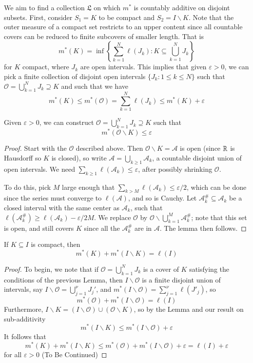 We aim to find a collection $\mathfrak{L}$ on which $m^*$ is countably additive on disjoint subsets. First, consider $S_1 = K$ to be compact and $S_2 = I\backslash K$. Note that the outer measure of a compact set restricts to an upper content since all countable covers can be reduced to finite subcovers of smaller length. That is $$m^*(K) = \inf\left\{\sum_{k=1}^N\ell(J_k):K\subseteq \bigcup_{k=1}^NJ_k\right\}$$ for $K$ compact, where $J_k$ are open intervals. This implies that given $\varepsilon > 0$, we can pick a finite collection of disjoint open intervals $\{J_k:1\leq k \leq N\}$ such that $\mathcal{O} = \bigcup_{k=1}^NJ_k\supseteq K$ and such that we have $$m^*(K) \leq m^*(\mathcal{O}) = \sum_{k=1}^N\ell(J_k)\leq m^*(K)+\varepsilon$$

\begin{lem}
    Given $\varepsilon > 0$, we can construct $\mathcal{O} = \bigcup_{k=1}^NJ_k \supseteq K$ such that $$m^*\left(\mathcal{O}\backslash K\right) \leq \varepsilon$$
\end{lem}
\begin{proof}
    Start with the $\mathcal{O}$ described above. Then $\mathcal{O}\backslash K = \mathcal{A}$ is open (since $\mathbb R$ is Hausdorff so $K$ is closed), so write $\mathcal{A} = \bigcup_{k\geq 1}\mathcal{A}_k$, a countable disjoint union of open intervals. We need $\sum_{k\geq 1}\ell(\mathcal{A}_k) \leq \varepsilon$, after possibly shrinking $\mathcal{O}$.

    To do this, pick $M$ large enough that $\sum_{k > M}\ell(\mathcal{A}_k) \leq \varepsilon/2$, which can be done since the series must converge to $\ell(\mathcal{A})$, and so is Cauchy. Let $\mathcal{A}_k^{\#} \subseteq \mathcal{A}_k$ be a closed interval with the same center as $\mathcal{A}_k$, such that $\ell(\mathcal{A}_k^{\#}) \geq \ell(\mathcal{A}_k) - \varepsilon/2M$. We replace $\mathcal{O}$ by $\mathcal{O}\backslash\bigcup_{k=1}^M\mathcal{A}_k^{\#}$; note that this set is open, and still covers $K$ since all the $\mathcal{A}_k^{\#}$ are in $\mathcal{A}$. The lemma then follows.
\end{proof}

\begin{prop}
    If $K \subseteq I$ is compact, then $$m^*(K) + m^*(I\backslash K) = \ell(I)$$
\end{prop}
\begin{proof}
    To begin, we note that if $\mathcal{O} = \bigcup_{k=1}^NJ_k$ is a cover of $K$ satisfying the conditions of the previous Lemma, then $I\backslash \mathcal{O}$ is a finite disjoint union of intervals, say $I \backslash\mathcal{O} = \bigcup_{j=1}^{\nu}J_j'$, and $m^*(I\backslash\mathcal{O}) = \sum_{j=1}^{\nu}\ell(J'_j)$, so $$m^*(\mathcal{O})+m^*(I\backslash\mathcal{O}) = \ell(I)$$
    Furthermore, $I\backslash K = (I\backslash\mathcal{O}) \cup(\mathcal{O}\backslash K)$, so by the Lemma and our result on sub-additivity $$m^*(I\backslash K) \leq m^*(I\backslash\mathcal{O}) + \varepsilon$$ 
    It follows that $$m^*(K) + m^*(I\backslash K) \leq m^*(\mathcal{O}) + m^*(I\backslash \mathcal{O}) + \varepsilon = \ell(I)+\varepsilon$$
    for all $\varepsilon > 0$ (To Be Continued)
\end{proof}

